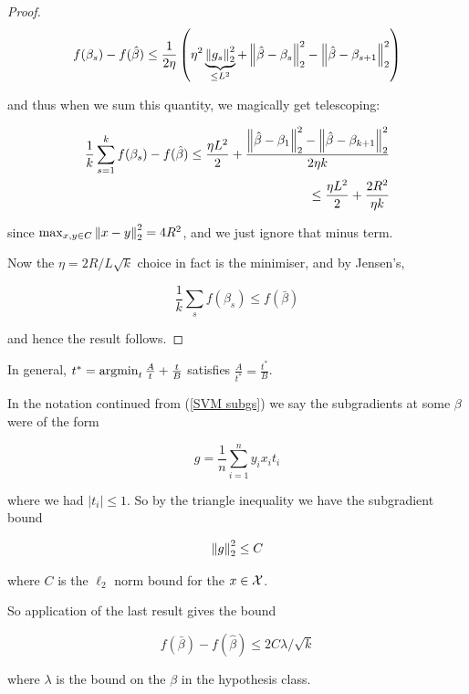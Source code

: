 \documentclass[11pt]{scrartcl}
\begin{document}
\begin{theorem}
\begin{proof}
\begin{equation}
    f(\beta_s) - f(\hat{\beta}) \le \frac{1}{2 \eta} \left( \eta^2 \underbrace{\left\lVert g_s\right\rVert_2^2}_{\le L^2} + \left\lVert\hat{\beta} - \beta_s\right\rVert_2^2 - \left\lVert\hat{\beta} - \beta_{s+1}\right\rVert_2^2 \right)
\end{equation}

and thus when we sum this quantity, we magically get telescoping: %

\begin{align}
\frac{1}{k} \sum_{s=1}^k f(\beta_s) - f(\hat{\beta}) \le \frac{\eta L^2}{2} + \frac{\left\lVert\hat{\beta} - \beta_1\right\rVert_2^2 - \left\lVert\hat{\beta} - \beta_{k+1}\right\rVert_2^2}{2\eta k} \\
\le \frac{\eta L^2}{2} + \frac{2R^2}{\eta k}
\end{align}

since $\max_{x,y \in C} \left\lVert x-y\right\rVert_2^2 = 4R^2$, and we just ignore that minus term.

Now the $\eta = 2R / L\sqrt{k}$ choice in fact is the minimiser, and by Jensen's,

\begin{equation}
    \frac1k \sum_s f(\beta_s) \le f(\bar{\beta})
\end{equation}

and hence the result follows.
\end{proof}
\end{theorem}

\begin{remark}
In general, $t^* = \operatorname*{arg min}_t \frac{A}{t} + \frac{t}{B}$ satisfies $\frac{A}{t^*} = \frac{t^*}{B}$.
\end{remark}

\begin{example}
In the notation continued from (\ref{SVM subgs}) we say the subgradients at some $\beta$ were of the form

\begin{equation}
    g = \frac1n \sum_{i=1}^n y_i x_i t_i
\end{equation}

where we had $|t_i| \le 1$. So by the triangle inequality we have the subgradient bound

\begin{equation}
    \left\lVert g\right\rVert_2^2 \le C
\end{equation}

where $C$ is the $\ell_2$ norm bound for the $x \in \mathcal{X}$.

So application of the last result gives the bound

\begin{equation}
    f(\bar{\beta}) - f(\hat{\beta}) \le 2C\lambda / \sqrt{k}
\end{equation}

where $\lambda$ is the bound on the $\beta$ in the hypothesis class.
\end{example}
\end{document}
